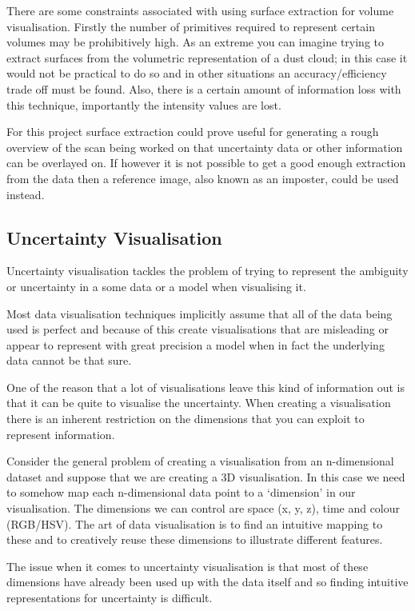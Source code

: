 \documentclass[
  oneside,
  11pt, a4paper,
  footinclude=true,
  headinclude=true,
  cleardoublepage=empty
]{scrbook}
\begin{document}
There are some constraints associated with using surface extraction for volume visualisation. Firstly the number of primitives required to represent certain volumes may be prohibitively high. As an extreme you can imagine trying to extract surfaces from the volumetric representation of a dust cloud; in this case it would not be practical to do so and in other situations an accuracy/efficiency trade off must be found. Also, there is a certain amount of information loss with this technique, importantly the intensity values are lost.

For this project surface extraction could prove useful for generating a rough overview of the scan being worked on that uncertainty data or other information can be overlayed on. If however it is not possible to get a good enough extraction from the data then a reference image, also known as an imposter, could be used instead.

\newpage
\subsection{Uncertainty Visualisation\cite{uncertaintyoverview}}
Uncertainty visualisation tackles the problem of trying to represent the ambiguity or uncertainty in a some data or a model when visualising it.

Most data visualisation techniques implicitly assume that all of the data being used is perfect and because of this create visualisations that are misleading or appear to represent with great precision a model when in fact the underlying data cannot be that sure.

One of the reason that a lot of visualisations leave this kind of information out is that it can be quite to visualise the uncertainty. When creating a visualisation there is an inherent restriction on the dimensions that you can exploit to represent information.

Consider the general problem of creating a visualisation from an n-dimensional dataset and suppose that we are creating a 3D visualisation. In this case we need to somehow map each n-dimensional data point to a ‘dimension’ in our visualisation. The dimensions we can control are space (x, y, z), time and colour (RGB/HSV). The art of data visualisation is to find an intuitive mapping to these and to creatively reuse these dimensions to illustrate different features.

The issue when it comes to uncertainty visualisation is that most of these dimensions have already been used up with the data itself and so finding intuitive representations for uncertainty is difficult.
\end{document}
